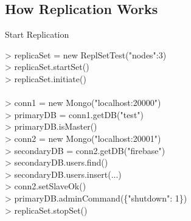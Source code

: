 \documentclass{beamer}
\begin{document}
\subsection{How Replication Works}
\begin{frame}{Start Replication}
\scriptsize
\begin{Alms*}
	> replicaSet = new ReplSetTest({"nodes":3}) \\
	> replicaSet.startSet() \\
	> replicaSet.initiate() \\
	\\
	> conn1 = new Mongo("localhost:20000") \\
	> primaryDB = conn1.getDB("test") \\
	> primaryDB.isMaster() \\
	> conn2 = new Mongo("localhost:20001") \\
	> secondaryDB = conn2.getDB("firebase") \\
	> secondaryDB.users.find() \\
	> secondaryDB.users.insert(...) \\
	> conn2.setSlaveOk() \\
	> primaryDB.adminCommand(\{"shutdown": 1\}) \\
	
	> replicaSet.stopSet() \\

\end{Alms*}

\end{frame}
\end{document}
